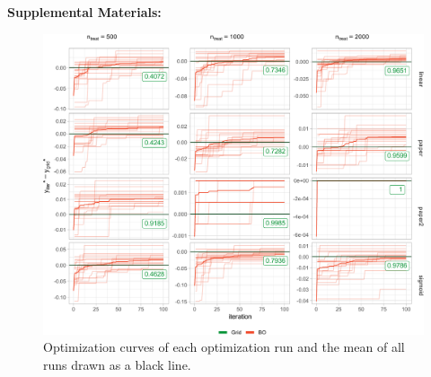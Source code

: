 \documentclass[bimj,fleqn]{w-art}
\theoremstyle{plain}
\theoremstyle{definition}
\begin{document}






\newpage
\phantom{aaaa}
\clearpage
\begin{center}
\textbf{\large Supplemental Materials: \newtitle}
\end{center}
\FloatBarrier
\setcounter{equation}{0}
\setcounter{figure}{0}
\setcounter{table}{0}
\setcounter{page}{1}
\makeatletter
\renewcommand{\theequation}{S\arabic{equation}}
\renewcommand{\thefigure}{S\arabic{figure}}
\renewcommand{\thetable}{S\arabic{table}}
\renewcommand{\bibnumfmt}[1]{[S#1]}



\begin{figure}[htb]
\centering
\includegraphics[width=\linewidth]{generated/figures/plot_opt_path.pdf}
\caption{%
  Optimization curves of each optimization run and the mean of all runs drawn as a black line.
  }
\label{fig:plot_opt_path} 
\end{figure}
\end{document}
